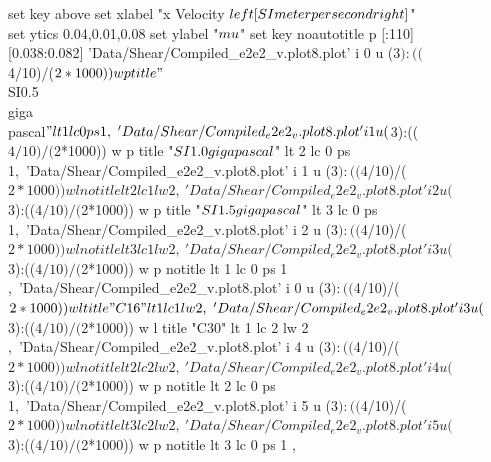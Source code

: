 \documentclass[aps,prb,reprint,superscriptaddress, a4paper]{revtex4-1}
\begin{document}
\begin{figure}
    	\begin{center}
		\begin{gnuplot}[terminal=pdf, terminaloptions={size \SERFigwidth cm, \SERFigheight cm color solid}]
			set key above
			set xlabel  "x Velocity $\\left[ \\SI{}{\\meter\\per\\second} \\right]$"  
			set ytics 0.04,0.01,0.08
			set ylabel "$\\mu$"
			set key noautotitle
			p [:110][0.038:0.082]	'Data/Shear/Compiled_e2e2_v.plot8.plot' i 0 u ($3):(($4/10)/($2*1000)) w p title "$\\SI{0.5}{\\giga\\pascal}$" lt 1 lc 0 ps 1,\
			        	'Data/Shear/Compiled_e2e2_v.plot8.plot' i 1 u ($3):(($4/10)/($2*1000)) w p title  "$\\SI{1.0}{\\giga\\pascal}$" lt 2 lc 0 ps 1,\
			        	'Data/Shear/Compiled_e2e2_v.plot8.plot' i 1 u ($3):(($4/10)/($2*1000)) w l notitle lt 2 lc 1  lw 2 ,\
			        	'Data/Shear/Compiled_e2e2_v.plot8.plot' i 2 u ($3):(($4/10)/($2*1000)) w p title  "$\\SI{1.5}{\\giga\\pascal}$" lt 3 lc 0 ps 1,\
			        	'Data/Shear/Compiled_e2e2_v.plot8.plot' i 2 u ($3):(($4/10)/($2*1000)) w l notitle lt 3 lc 1 lw 2 ,\
			        	'Data/Shear/Compiled_e2e2_v.plot8.plot' i 3 u ($3):(($4/10)/($2*1000)) w p notitle lt 1 lc 0 ps 1 ,\
        				'Data/Shear/Compiled_e2e2_v.plot8.plot' i 0 u ($3):(($4/10)/($2*1000)) w l title "C16" lt 1 lc 1 lw 2 ,\
		        		'Data/Shear/Compiled_e2e2_v.plot8.plot' i 3 u ($3):(($4/10)/($2*1000)) w l title "C30" lt 1 lc 2 lw 2 ,\				
				        'Data/Shear/Compiled_e2e2_v.plot8.plot' i 4 u ($3):(($4/10)/($2*1000)) w l notitle lt 2 lc 2 lw 2 ,\
				        'Data/Shear/Compiled_e2e2_v.plot8.plot' i 4 u ($3):(($4/10)/($2*1000)) w p notitle lt 2 lc 0 ps 1,\
        				'Data/Shear/Compiled_e2e2_v.plot8.plot' i 5 u ($3):(($4/10)/($2*1000)) w l notitle lt 3 lc 2 lw 2 ,\
		        		'Data/Shear/Compiled_e2e2_v.plot8.plot' i 5 u ($3):(($4/10)/($2*1000)) w p notitle lt 3 lc 0 ps 1 ,\

\end{gnuplot}
\end{center}
\end{figure}
\end{document}
